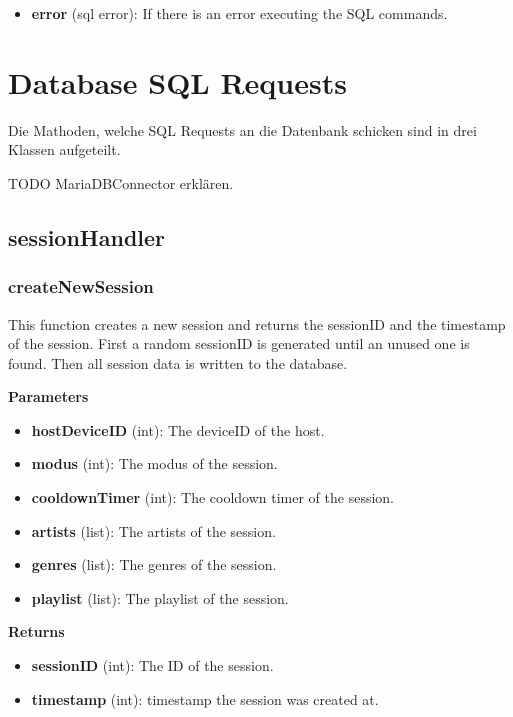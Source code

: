 \documentclass[oneside, nenglish]{sdqtechreport}
\begin{document}
\begin{itemize}
\begin{itemize}
    \item \textbf{error} (sql error): If there is an error executing the SQL commands.
\end{itemize}

\section{Database SQL Requests}

Die Mathoden, welche SQL Requests an die Datenbank schicken sind in drei Klassen aufgeteilt.


TODO MariaDBConnector erklären.

\subsection{sessionHandler}

\subsubsection{createNewSession}

This function creates a new session and returns the sessionID and the timestamp of the session. First a random sessionID is generated until an unused one is found. Then all session data is written to the database.

\textbf{Parameters}

\begin{itemize} \item \textbf{hostDeviceID} (int): The deviceID of the host. \item \textbf{modus} (int): The modus of the session. \item \textbf{cooldownTimer} (int): The cooldown timer of the session. \item \textbf{artists} (list): The artists of the session. \item \textbf{genres} (list): The genres of the session. \item \textbf{playlist} (list): The playlist of the session. \end{itemize}

\textbf{Returns}

\begin{itemize} \item \textbf{sessionID} (int): The ID of the session. \item \textbf{timestamp} (int): timestamp the session was created at. \end{itemize}


\end{itemize}
\end{document}
